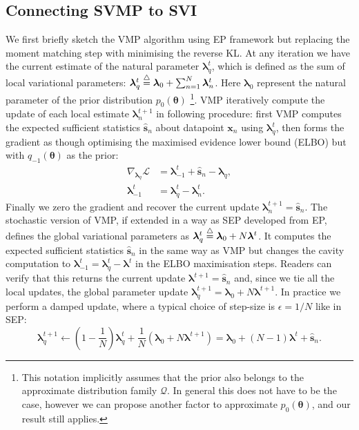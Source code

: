 \documentclass{article} %
\begin{document}
\subsection{Connecting SVMP to SVI}
We first briefly sketch the VMP algorithm using EP framework but replacing the moment matching step with minimising the reverse KL. At any iteration we have the current estimate of the natural parameter $\bm{\lambda}_q^t$, which is defined as the sum of local variational parameters:
%
$\bm{\lambda}_q^t \buildrel\triangle\over = \bm{\lambda}_0 + \sum_{n=1}^N \bm{\lambda}_n^t$.
%
Here $\bm{\lambda}_0$ represent the natural parameter of the prior distribution $p_0(\bm{\theta})$ \footnote{This notation implicitly assumes that the prior also belongs to the approximate distribution family $\mathcal{Q}$. In general this does not have to be the case, however we can propose another factor to approximate $p_0(\bm{\theta})$, and our result still applies.}. VMP iteratively compute the update of each local estimate $\bm{\lambda}_n^{t+1}$ in following procedure: first VMP computes the expected sufficient statistics $\hat{\bm{s}}_n$ about datapoint $\bm{x}_n$ using $\bm{\lambda}_q^t$, then forms the gradient as though optimising the maximised evidence lower bound (ELBO) but with $q_{-1}(\bm{\theta})$ as the prior:
\begin{align}
\nabla_{\bm{\lambda}_q} \mathcal{L} &= \bm{\lambda}_{-1}^t + \hat{\bm{s}}_n - \bm{\lambda}_q, \\
\bm{\lambda}_{-1}^t &= \bm{\lambda}_q^t - \bm{\lambda}_{n}^t.
\end{align}
Finally we zero the gradient and recover the current update $\bm{\lambda}_n^{t+1} = \hat{\bm{s}}_n$. The stochastic version of VMP, if extended in a way as SEP developed from EP, defines the global variational parameters as $\bm{\lambda}_q^t \buildrel\triangle\over = \bm{\lambda}_0 + N \bm{\lambda}^t$. It computes the expected sufficient statistics $\hat{\bm{s}}_n$ in the same way as VMP but changes the cavity computation to $\bm{\lambda}_{-1}^t = \bm{\lambda}_q^t - \bm{\lambda}^t$ in the ELBO maximisation steps. Readers can verify that this returns the current update $\bm{\lambda}^{t+1} = \hat{\bm{s}}_n$ and, since we tie all the local updates, the global parameter update $\bm{\lambda}_q^{t+1} = \bm{\lambda}_0 + N \bm{\lambda}^{t+1}$. In practice we perform a damped update, where a typical choice of step-size is $\epsilon = 1/N$ like in SEP:
\begin{equation}
\bm{\lambda}_q^{t+1} \leftarrow (1 - \frac{1}{N}) \bm{\lambda}_q^t + \frac{1}{N}(\bm{\lambda}_0 + N \bm{\lambda}^{t+1}) = \bm{\lambda}_0 + (N-1) \bm{\lambda}^t + \hat{\bm{s}}_n.
\end{equation} 
\end{document}
